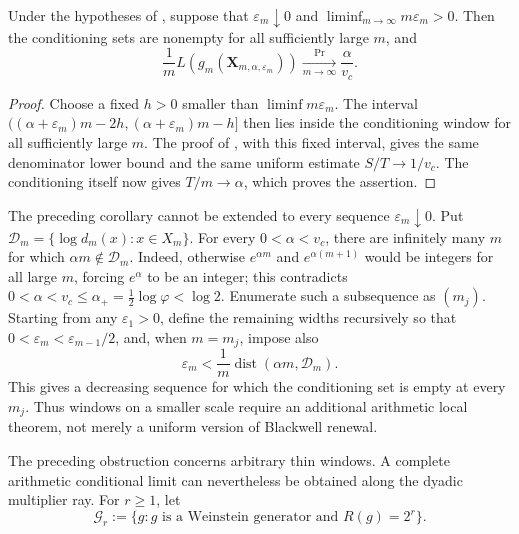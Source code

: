 \begin{corollary}
\label{cor:shrinking-window-phase-separation}
Under the hypotheses of , suppose that
\(\varepsilon_m\downarrow0\) and
\(\liminf_{m\to\infty}m\varepsilon_m>0\).  Then the conditioning sets are
nonempty for all sufficiently large \(m\), and
\[
 \frac1mL(g_m(\mathbf X_{m,\alpha,\varepsilon_m}))
 \xrightarrow[m\to\infty]{\Pr}\frac\alpha{v_c}.
\]
\end{corollary}

\begin{proof}
Choose a fixed \(h>0\) smaller than
\(\liminf m\varepsilon_m\).  The interval
\(((\alpha+\varepsilon_m)m-2h,
   (\alpha+\varepsilon_m)m-h]\) then lies inside the conditioning window for
all sufficiently large \(m\).  The proof of
, with this fixed interval, gives the
same denominator lower bound and the same uniform estimate
\(S/T\to1/v_c\).  The conditioning itself now gives \(T/m\to\alpha\), which
proves the assertion.
\end{proof}

\begin{remark}
\label{rem:shrinking-window-arithmetic-obstruction}
The preceding corollary cannot be extended to every sequence
\(\varepsilon_m\downarrow0\).  Put
\(\mathcal D_m=\{\log d_m(x):x\in X_m\}\).  For every
\(0<\alpha<v_c\), there are infinitely many \(m\) for which
\(\alpha m\notin\mathcal D_m\).  Indeed, otherwise \(e^{\alpha m}\) and
\(e^{\alpha(m+1)}\) would be integers for all large \(m\), forcing
\(e^\alpha\) to be an integer; this contradicts
\(0<\alpha<v_c\le\alpha_+=\tfrac12\log\varphi<\log2\).
Enumerate such a subsequence as \((m_j)\).  Starting from any
\(\varepsilon_1>0\), define the remaining widths recursively so that
\(0<\varepsilon_m<\varepsilon_{m-1}/2\), and, when \(m=m_j\), impose also
\[
 \varepsilon_m<\frac1m
 \operatorname{dist}(\alpha m,\mathcal D_m).
\]
This gives a decreasing sequence for which the conditioning set is empty at
every \(m_j\).  Thus windows on a smaller scale require an additional
arithmetic local theorem, not merely a uniform version of Blackwell renewal.
\end{remark}

The preceding obstruction concerns arbitrary thin windows.  A complete
arithmetic conditional limit can nevertheless be obtained along the dyadic
multiplier ray.  For \(r\ge1\), let
\[
 \mathcal G_r:=\{g:\text{\(g\) is a Weinstein generator and }R(g)=2^r\}.
\]

